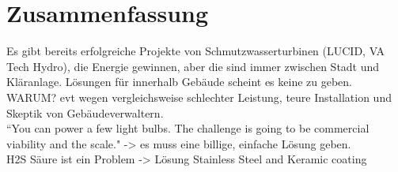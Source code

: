 \section{Zusammenfassung}

Es gibt bereits erfolgreiche Projekte von Schmutzwasserturbinen (LUCID, VA Tech Hydro), die Energie gewinnen, aber die sind immer zwischen Stadt und Kläranlage. Lösungen für innerhalb Gebäude scheint es keine zu geben. WARUM? evt wegen vergleichsweise schlechter Leistung, teure Installation und Skeptik von Gebäudeverwaltern.\\
“You can power a few light bulbs. The challenge is going to be commercial viability and the scale."
-> es muss eine billige, einfache Lösung geben.\\
H2S Säure ist ein Problem -> Lösung Stainless Steel and Keramic coating\\
